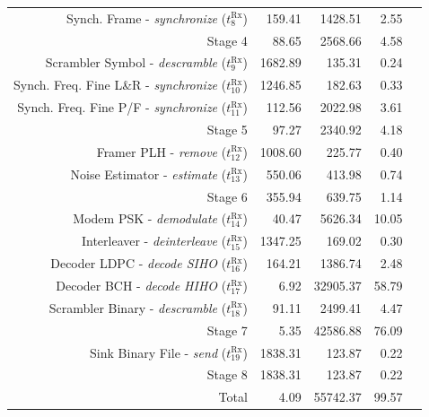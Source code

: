 \documentclass[11pt]{report}
\begin{document}
\begin{table}[h]
{{\begin{tabular}{r r r r r}
        \rowcolor{Paired_1!15}           Synch. Frame -  \emph{synchronize} ($t^\text{Rx}_{8}$)  & 159.41     & 1428.51  & 2.55  \\
        Stage 4                                                                                  & 88.65      & 2568.66  & 4.58  \\ \addlinespace
        Scrambler Symbol -   \emph{descramble} ($t^\text{Rx}_{9}$)                               & 1682.89    & 135.31   & 0.24  \\
        \rowcolor{Paired_1!15} Synch. Freq. Fine L\&R -  \emph{synchronize} ($t^\text{Rx}_{10}$) & 1246.85    & 182.63   & 0.33  \\
        Synch. Freq. Fine P/F -  \emph{synchronize} ($t^\text{Rx}_{11}$)                         & 112.56     & 2022.98  & 3.61  \\
        Stage 5                                                                                  & 97.27      & 2340.92  & 4.18  \\ \addlinespace
        Framer PLH -       \emph{remove} ($t^\text{Rx}_{12}$)                                    & 1008.60    & 225.77   & 0.40  \\
        Noise Estimator -     \emph{estimate} ($t^\text{Rx}_{13}$)                               & 550.06     & 413.98   & 0.74  \\
        Stage 6                                                                                  & 355.94     & 639.75   & 1.14  \\ \addlinespace
        Modem PSK -   \emph{demodulate} ($t^\text{Rx}_{14}$)                                     & 40.47      & 5626.34  & 10.05 \\
        Interleaver - \emph{deinterleave} ($t^\text{Rx}_{15}$)                                   & 1347.25    & 169.02   & 0.30  \\
        Decoder LDPC -  \emph{decode SIHO} ($t^\text{Rx}_{16}$)                                  & 164.21     & 1386.74  & 2.48  \\
        Decoder BCH -  \emph{decode HIHO} ($t^\text{Rx}_{17}$)                                   & 6.92       & 32905.37 & 58.79 \\
        Scrambler Binary -   \emph{descramble} ($t^\text{Rx}_{18}$)                              & 91.11      & 2499.41  & 4.47  \\
        \rowcolor{Paired_7!15}                Stage 7                                            & 5.35       & 42586.88 & 76.09 \\ \addlinespace
        \rowcolor{Paired_1!15}       Sink Binary File -         \emph{send} ($t^\text{Rx}_{19}$) & 1838.31    & 123.87   & 0.22  \\
        Stage 8                                                                                  & 1838.31    & 123.87   & 0.22  \\ \midrule
        Total                                                                                    & 4.09       & 55742.37 & 99.57 \\
        \bottomrule
      \end{tabular}
    }}
\end{table}
\end{document}
